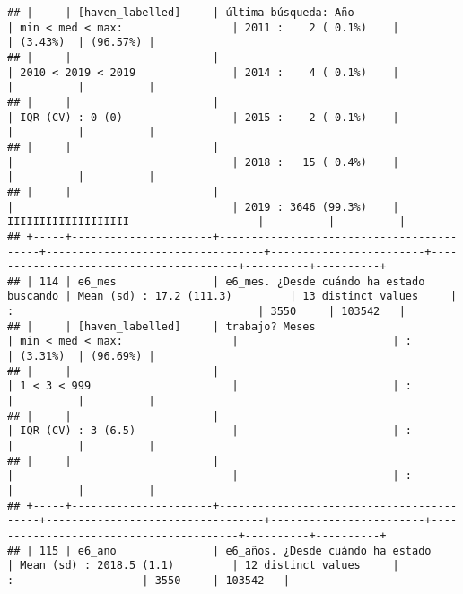 \documentclass[]{article}
\begin{document}
\begin{verbatim}
## |     | [haven_labelled]     | última búsqueda: Año                     | min < med < max:                 | 2011 :    2 ( 0.1%)    |                                        | (3.43%)  | (96.57%) |
## |     |                      |                                          | 2010 < 2019 < 2019               | 2014 :    4 ( 0.1%)    |                                        |          |          |
## |     |                      |                                          | IQR (CV) : 0 (0)                 | 2015 :    2 ( 0.1%)    |                                        |          |          |
## |     |                      |                                          |                                  | 2018 :   15 ( 0.4%)    |                                        |          |          |
## |     |                      |                                          |                                  | 2019 : 3646 (99.3%)    | IIIIIIIIIIIIIIIIIII                    |          |          |
## +-----+----------------------+------------------------------------------+----------------------------------+------------------------+----------------------------------------+----------+----------+
## | 114 | e6_mes               | e6_mes. ¿Desde cuándo ha estado buscando | Mean (sd) : 17.2 (111.3)         | 13 distinct values     | :                                      | 3550     | 103542   |
## |     | [haven_labelled]     | trabajo? Meses                           | min < med < max:                 |                        | :                                      | (3.31%)  | (96.69%) |
## |     |                      |                                          | 1 < 3 < 999                      |                        | :                                      |          |          |
## |     |                      |                                          | IQR (CV) : 3 (6.5)               |                        | :                                      |          |          |
## |     |                      |                                          |                                  |                        | :                                      |          |          |
## +-----+----------------------+------------------------------------------+----------------------------------+------------------------+----------------------------------------+----------+----------+
## | 115 | e6_ano               | e6_años. ¿Desde cuándo ha estado         | Mean (sd) : 2018.5 (1.1)         | 12 distinct values     |                   :                    | 3550     | 103542   |

\end{verbatim}
\end{document}
